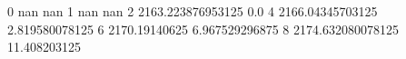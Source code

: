0 nan nan
1 nan nan
2 2163.223876953125 0.0
4 2166.04345703125 2.819580078125
6 2170.19140625 6.967529296875
8 2174.632080078125 11.408203125
